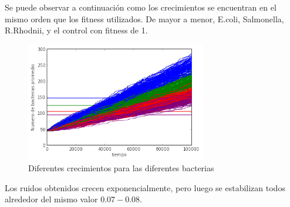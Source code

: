 \documentclass[12pt]{article}
\numberwithin{equation}{section}
\begin{document}
Se puede observar a continuación como los crecimientos se encuentran en el mismo orden que los fitness utilizados. De mayor a menor, E.coli, Salmonella, R.Rhodnii, y el control con fitness de 1.\\
\begin{figure}[!ht]
\includegraphics[width=0.7\textwidth]{todasLasCorridas.png}
\caption{Diferentes crecimientos para las diferentes bacterias}
\FloatBarrier
\end{figure}
\FloatBarrier
Los ruidos obtenidos crecen exponencialmente, pero luego se estabilizan todos alrededor del mismo valor $0.07-0.08$.\\

\begin{figure}[!ht]
\begin{floatrow}
\end{floatrow}
\FloatBarrier
\end{figure}
\FloatBarrier
\end{document}
